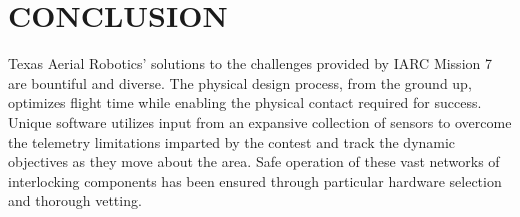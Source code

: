 \documentclass[12pt,letterpaper]{article}
\begin{document}
\section*{CONCLUSION}
	Texas Aerial Robotics' solutions to the challenges provided by IARC Mission 7 are bountiful and diverse. The physical design process, from the ground up, optimizes flight time while enabling the physical contact required for success. Unique software utilizes input from an expansive collection of sensors to overcome the telemetry limitations imparted by the contest and track the dynamic objectives as they move about the area. Safe operation of these vast networks of interlocking components has been ensured through particular hardware selection and thorough vetting.
	\nocite{ORBSLAM2}
	\nocite{daoud2018slamm}
	
	
\end{document}
